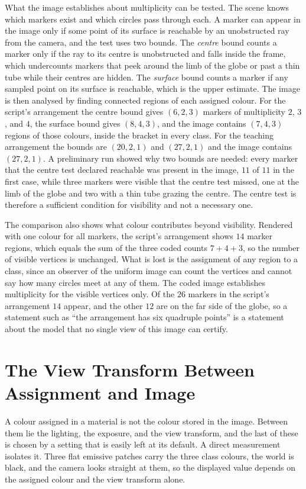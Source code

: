 What the image establishes about multiplicity can be tested. The scene knows which markers exist and which circles pass through each. A marker can appear in the image only if some point of its surface is reachable by an unobstructed ray from the camera, and the test uses two bounds. The \emph{centre} bound counts a marker only if the ray to its centre is unobstructed and falls inside the frame, which undercounts markers that peek around the limb of the globe or past a thin tube while their centres are hidden. The \emph{surface} bound counts a marker if any sampled point on its surface is reachable, which is the upper estimate. The image is then analysed by finding connected regions of each assigned colour. For the script's arrangement the centre bound gives $(6,2,3)$ markers of multiplicity $2$, $3$, and $4$, the surface bound gives $(8,4,3)$, and the image contains $(7,4,3)$ regions of those colours, inside the bracket in every class. For the teaching arrangement the bounds are $(20,2,1)$ and $(27,2,1)$ and the image contains $(27,2,1)$. A preliminary run showed why two bounds are needed: every marker that the centre test declared reachable was present in the image, $11$ of $11$ in the first case, while three markers were visible that the centre test missed, one at the limb of the globe and two with a thin tube grazing the centre. The centre test is therefore a sufficient condition for visibility and not a necessary one.

The comparison also shows what colour contributes beyond visibility. Rendered with one colour for all markers, the script's arrangement shows $14$ marker regions, which equals the sum of the three coded counts $7+4+3$, so the number of visible vertices is unchanged. What is lost is the assignment of any region to a class, since an observer of the uniform image can count the vertices and cannot say how many circles meet at any of them. The coded image establishes multiplicity for the visible vertices only. Of the $26$ markers in the script's arrangement $14$ appear, and the other $12$ are on the far side of the globe, so a statement such as ``the arrangement has six quadruple points'' is a statement about the model that no single view of this image can certify.

\section{The View Transform Between Assignment and Image}

A colour assigned in a material is not the colour stored in the image. Between them lie the lighting, the exposure, and the view transform, and the last of these is chosen by a setting that is easily left at its default. A direct measurement isolates it. Three flat emissive patches carry the three class colours, the world is black, and the camera looks straight at them, so the displayed value depends on the assigned colour and the view transform alone.

